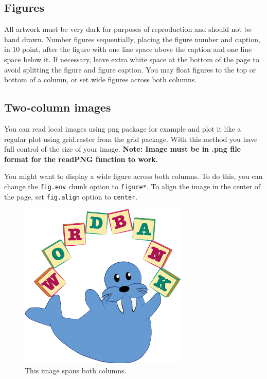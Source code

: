 \documentclass[11pt]{article}
\newenvironment{CodeChunk}{}{}
\begin{document}
\subsection{Figures}\label{figures}

All artwork must be very dark for purposes of reproduction and should
not be hand drawn. Number figures sequentially, placing the figure
number and caption, in 10 point, after the figure with one line space
above the caption and one line space below it. If necessary, leave extra
white space at the bottom of the page to avoid splitting the figure and
figure caption. You may float figures to the top or bottom of a column,
or set wide figures across both columns.

\subsection{Two-column images}\label{two-column-images}

You can read local images using png package for example and plot it like
a regular plot using grid.raster from the grid package. With this method
you have full control of the size of your image. \textbf{Note: Image
must be in .png file format for the readPNG function to work.}

You might want to display a wide figure across both columns. To do this,
you can change the \texttt{fig.env} chunk option to \texttt{figure*}. To
align the image in the center of the page, set \texttt{fig.align} option
to \texttt{center}.

\begin{CodeChunk}
\begin{figure}[h]

{\centering \includegraphics{figs/2-col-image-1} 

}

\caption[This image spans both columns]{This image spans both columns.}\label{fig:2-col-image}
\end{figure}
\end{CodeChunk}
\end{document}
